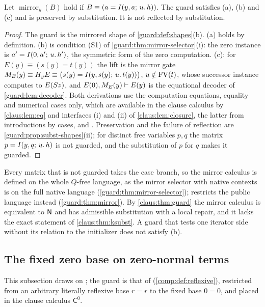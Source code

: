 \begin{proposition}
\label{claus:prop:mirror}
Let $\operatorname{mirror}_y(B)$ hold if $B\equiv(a=I(y,a;\,u.\,h))$.
The guard satisfies (a), (b) and (c) and is preserved by substitution. It
is not reflected by substitution.
\end{proposition}
\begin{proof}
The guard is the mirrored shape of \cref{guard:def:shapes}(b). (a) holds
by definition. (b) is condition (S1) of
\cref{guard:thm:mirror-selector}(i): the zero instance is
$a'=I(0,a';\,u.\,h')$, the symmetric form of the zero computation. (c):
for $E(y)\equiv(s(y)=t(y))$ the lift is the mirror gate
$M_E(y)\equiv H_yE\equiv\bigl(s(y)=I(y,s(y);\,u.\,t(y))\bigr)$,
$u\notin\operatorname{FV}(t)$, whose successor instance computes to $E(S z)$, and
$E(0),M_E(y)\vdash E(y)$ is the equational decoder of
\cref{guard:lem:decoder}. Both derivations use the computation
equations, equality and numerical cases only, which are available in the
clause calculus by \cref{claus:lem:eq} and interfaces (i) and (ii) of
\cref{claus:lem:closure}, the latter from introductions by cases,
 and . Preservation and the failure of
reflection are \cref{guard:prop:subst-shapes}(ii); for distinct free
variables $p,q$ the matrix $p=I(y,q;\,u.\,h)$ is not guarded, and the
substitution of $p$ for $q$ makes it guarded.
\end{proof}

Every matrix that is not guarded takes the case branch, so the mirror
calculus is defined on the whole $Q$-free language, as the mirror selector
with native contexts is on the full native language
(\cref{guard:thm:mirror-selector});  restricts the
public language instead (\cref{guard:thm:mirror}).
By \cref{claus:thm:guard} the mirror
calculus is equivalent to $\mathsf{N}$ and has admissible substitution with a
local repair, and it lacks the exact statement of
\cref{claus:thm:ksubst}. A guard that tests one iterator side without its
relation to the initializer does not satisfy (b).

\subsection{The fixed zero base on zero-normal terms}
\label{claus:sec:fixedzero}

This subsection draws on ; the guard is that of
 (\cref{comp:def:reflexive}), restricted from an
arbitrary literally reflexive base $r=r$ to the fixed base $0=0$, and
placed in the clause calculus $\mathsf{C}^{0}$.

